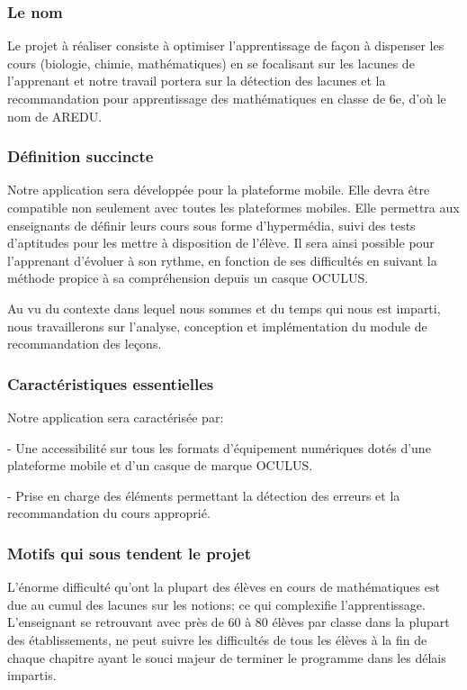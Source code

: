 \subsubsection{Le nom}
	Le projet à réaliser consiste à optimiser l’apprentissage de façon à dispenser les cours (biologie, chimie, mathématiques) en se focalisant sur les lacunes de l’apprenant et notre travail portera sur la détection des lacunes et la recommandation pour apprentissage des mathématiques en classe de 6e, d’où le nom de AREDU.

\subsubsection{Définition succincte }
	Notre application sera développée pour la plateforme mobile. Elle devra être compatible non seulement avec toutes les plateformes mobiles. Elle permettra aux enseignants de définir leurs cours sous forme d’hypermédia, suivi des tests d’aptitudes pour les mettre à disposition de l’élève. Il sera ainsi possible pour l’apprenant d’évoluer à son rythme, en fonction de ses difficultés en suivant la méthode propice à sa compréhension depuis un casque OCULUS. 
	
\noindent

	Au vu du contexte dans lequel nous sommes et du temps qui nous est imparti, nous travaillerons sur l’analyse, conception et implémentation du module de recommandation des leçons.

\subsubsection{Caractéristiques essentielles}
Notre application sera caractérisée par: 

\noindent

	- Une accessibilité sur tous les formats d’équipement numériques dotés d’une plateforme mobile et d’un casque de marque OCULUS. 
	
\noindent

	- Prise en charge des éléments permettant la détection des erreurs et la recommandation du cours approprié.

\subsubsection{Motifs qui sous tendent le projet}

\noindent

L’énorme difficulté qu’ont la plupart des élèves en cours de mathématiques est due au cumul des lacunes sur les notions; ce qui complexifie l'apprentissage. L’enseignant se retrouvant avec près de 60 à 80 élèves par classe dans la plupart des établissements, ne peut suivre les difficultés de tous les élèves à la fin de chaque chapitre ayant le souci majeur de terminer le programme dans les délais impartis. \\

